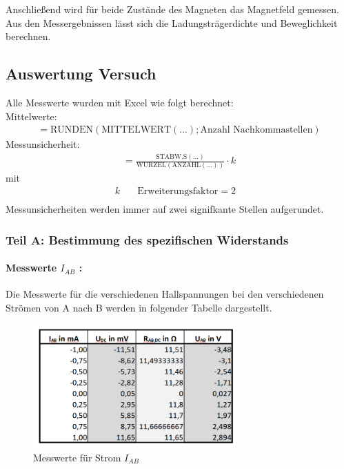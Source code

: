 \documentclass[a4paper]{scrartcl}
\numberwithin{equation}{subsection}
\begin{document}
Anschließend wird für beide Zustände des Magneten das Magnetfeld gemessen. \\

Aus den Messergebnissen lässt sich die Ladungsträgerdichte und Beweglichkeit berechnen.

\newpage

\subsection{Auswertung Versuch}
Alle Messwerte wurden mit Excel wie folgt berechnet:\\
Mittelwerte:
\begin{align}
=\text{RUNDEN}(\text{MITTELWERT}(...);\text{Anzahl Nachkommastellen})
\end{align}
Messunsicherheit:
\begin{align}
=\frac{\text{STABW.S}(...)}{\text{WURZEL}(\text{ANZAHL}(...))} \cdot k
\end{align}
mit
\begin{align*}
k \quad &\text{Erweiterungsfaktor} = 2&\\
\end{align*}
Messunsicherheiten werden immer auf zwei signifkante Stellen aufgerundet.
\subsubsection{Teil A: Bestimmung des spezifischen Widerstands}
\paragraph{Messwerte $I_{AB}$ :\\}
Die Messwerte für die verschiedenen Hallspannungen bei den verschiedenen Strömen von A nach B werden in folgender Tabelle dargestellt.

\begin{figure}[H]
\includegraphics[width=8cm]{tabelle_messwerte_Iab}
\centering
\caption{Messwerte für Strom $I_{AB}$}
\centering
\label{fig:tabelle-messwerte-Iab}
\end{figure}
\end{document}
